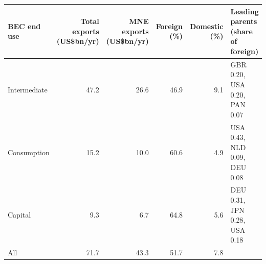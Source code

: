 \begin{tabular}{@{}l r r r r l@{}}
\toprule
BEC end use & Total exports (US\$bn/yr) & MNE exports (US\$bn/yr) & Foreign (\%) & Domestic (\%) & Leading parents (share of foreign) \\
\midrule
Intermediate & 47.2 & 26.6 & 46.9 & 9.1 & GBR 0.20, USA 0.20, PAN 0.07 \\
Consumption & 15.2 & 10.0 & 60.6 & 4.9 & USA 0.43, NLD 0.09, DEU 0.08 \\
Capital & 9.3 & 6.7 & 64.8 & 5.6 & DEU 0.31, JPN 0.28, USA 0.18 \\
\midrule
All & 71.7 & 43.3 & 51.7 & 7.8 & \\
\bottomrule
\end{tabular}
